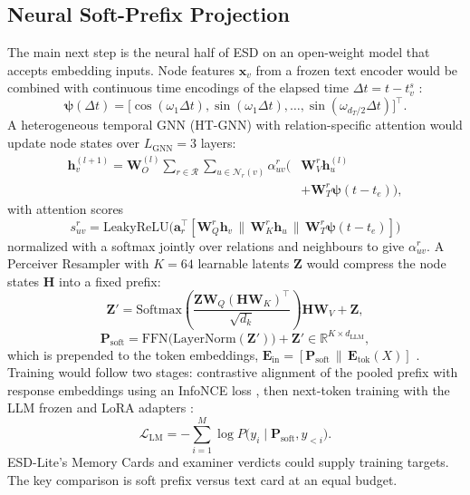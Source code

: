\documentclass[conference]{IEEEtran}
\begin{document}
\subsection{Neural Soft-Prefix Projection}
The main next step is the neural half of ESD on an open-weight model that accepts embedding inputs. Node features $\mathbf{x}_v$ from a frozen text encoder would be combined with continuous time encodings of the elapsed time $\Delta t = t - t_v^s$ \cite{b_tgat,b_tgn}:
\begin{equation}
\boldsymbol{\psi}(\Delta t) = \big[ \cos(\omega_1 \Delta t), \sin(\omega_1 \Delta t), \dots, \sin(\omega_{d_T/2} \Delta t) \big]^{\top}.
\end{equation}
A heterogeneous temporal GNN (HT-GNN) with relation-specific attention would update node states over $L_{\text{GNN}} = 3$ layers:
\begin{equation}
\begin{split}
\mathbf{h}_v^{(l+1)} = \mathbf{W}_O^{(l)} \sum_{r \in \mathcal{R}} \sum_{u \in \mathcal{N}_r(v)} \alpha_{uv}^r
 \Big( &\mathbf{W}_V^r \mathbf{h}_u^{(l)} \\
 &+ \mathbf{W}_T^r \boldsymbol{\psi}(t - t_e) \Big),
\end{split}
\end{equation}
with attention scores
\begin{equation}
s_{uv}^r = \text{LeakyReLU}\big(\mathbf{a}_r^{\top} [\mathbf{W}_Q^r \mathbf{h}_v \,\|\, \mathbf{W}_K^r \mathbf{h}_u \,\|\, \mathbf{W}_T^r \boldsymbol{\psi}(t - t_e)]\big)
\end{equation}
normalized with a softmax jointly over relations and neighbours to give $\alpha_{uv}^r$. A Perceiver Resampler \cite{b_perceiverio,b_flamingo} with $K = 64$ learnable latents $\mathbf{Z}$ would compress the node states $\mathbf{H}$ into a fixed prefix:
\begin{equation}
\mathbf{Z}' = \text{Softmax}\!\left(\frac{\mathbf{Z}\mathbf{W}_Q (\mathbf{H}\mathbf{W}_K)^{\top}}{\sqrt{d_k}}\right) \mathbf{H}\mathbf{W}_V + \mathbf{Z},
\end{equation}
\begin{equation}
\mathbf{P}_{\text{soft}} = \text{FFN}\big(\text{LayerNorm}(\mathbf{Z}')\big) + \mathbf{Z}' \in \mathbb{R}^{K \times d_{\text{LLM}}},
\end{equation}
which is prepended to the token embeddings, $\mathbf{E}_{\text{in}} = [\mathbf{P}_{\text{soft}} \,\|\, \mathbf{E}_{\text{tok}}(X)]$ \cite{b_prefix,b_gretriever}. Training would follow two stages: contrastive alignment of the pooled prefix with response embeddings using an InfoNCE loss \cite{b_infonce}, then next-token training with the LLM frozen and LoRA adapters \cite{b_lora}:
\begin{equation}
\mathcal{L}_{\text{LM}} = -\sum_{i=1}^{M} \log P\big(y_i \mid \mathbf{P}_{\text{soft}}, y_{<i}\big).
\end{equation}
ESD-Lite's Memory Cards and examiner verdicts could supply training targets. The key comparison is soft prefix versus text card at an equal budget.
\end{document}
